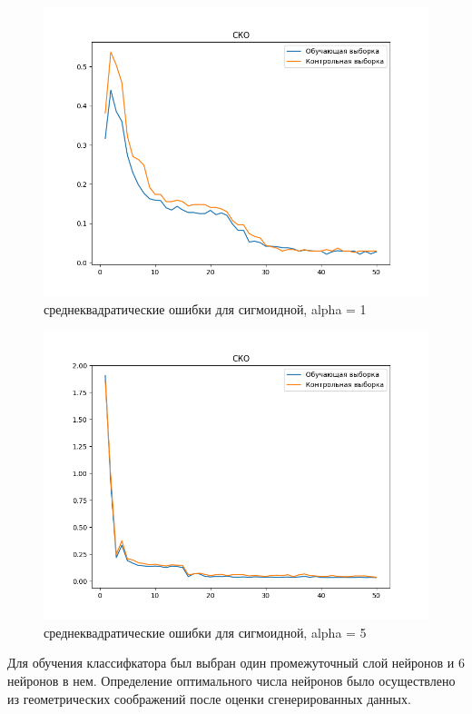 \documentclass[12pt]{report}
\begin{document}
\begin{figure}[h!]
  \centering
  \includegraphics[width = \linewidth / 2]{std_sigmoid_1.png}
  \caption{среднеквадратические ошибки для сигмоидной, alpha = 1}
  \label{fig:sigmoid_1_std}
\end{figure}

\begin{figure}[h!]
  \centering
  \includegraphics[width = \linewidth / 2]{std_sigmoid_5.png}
  \caption{среднеквадратические ошибки для сигмоидной, alpha = 5}
  \label{fig:sigmoid_5_std}
\end{figure}

\newpage

Для обучения классифкатора был выбран один промежуточный слой нейронов и 6 нейронов в нем. Определение оптимального числа нейронов было осуществлено из геометрических соображений после оценки сгенерированных данных. 
\end{document}
